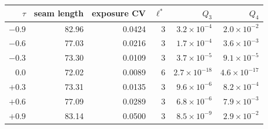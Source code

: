 \begin{tabular}{@{}rrrrrr@{}}
\toprule
$\tau$ & seam length & exposure CV & $\ell^*$ & $Q_3$ & $Q_4$ \\
\midrule
$-0.9$ & 82.96 & 0.0424 & 3 & $3.2\times10^{-4}$ & $2.0\times10^{-2}$ \\
$-0.6$ & 77.03 & 0.0216 & 3 & $1.7\times10^{-4}$ & $3.6\times10^{-3}$ \\
$-0.3$ & 73.30 & 0.0109 & 3 & $3.7\times10^{-5}$ & $9.1\times10^{-5}$ \\
$0.0$ & 72.02 & 0.0089 & 6 & $2.7\times10^{-18}$ & $4.6\times10^{-17}$ \\
$+0.3$ & 73.31 & 0.0135 & 3 & $9.6\times10^{-6}$ & $8.2\times10^{-4}$ \\
$+0.6$ & 77.09 & 0.0289 & 3 & $6.8\times10^{-6}$ & $7.9\times10^{-3}$ \\
$+0.9$ & 83.14 & 0.0500 & 3 & $8.5\times10^{-9}$ & $2.9\times10^{-2}$ \\
\bottomrule
\end{tabular}
